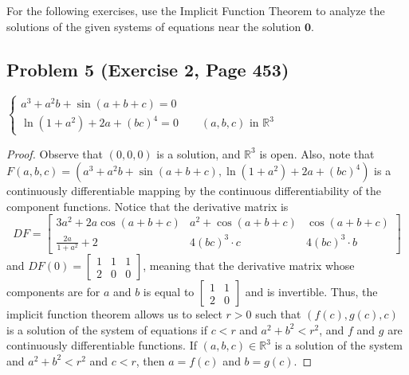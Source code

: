 \documentclass{article}
\begin{document}
For the following exercises, use the Implicit Function Theorem to analyze the solutions of the given systems of equations near the solution $\textbf{0}$.

\subsection*{Problem 5 (Exercise 2, Page 453)}
$\begin{cases} a^3 + a^2b + \sin{(a + b + c)} = 0 \\ \ln{(1 + a^2)} + 2a + (bc)^4 = 0 \qquad \text{$(a, b, c)$ in $\mathbb{R}^3$} \end{cases}$
\begin{proof}
Observe that $(0, 0, 0)$ is a solution, and $\mathbb{R}^3$ is open. Also, note that $F(a, b, c) = (a^3 + a^2b + \sin{(a + b + c)}, \ln{(1 + a^2)} + 2a + (bc)^4)$ is a continuously differentiable mapping by the continuous differentiability of the component functions. Notice that the derivative matrix is 
\[ DF = \begin{bmatrix} 3a^2+2a\cos(a+b+c) & a^2 + \cos(a+b+c) & \cos(a+b+c) \\
\frac{2a}{1+a^2} + 2 & 4(bc)^3 \cdot c & 4(bc)^3 \cdot b 
\end{bmatrix}\]
and $DF(0) = \begin{bmatrix} 1 & 1 & 1 \\ 2 & 0 & 0 \end{bmatrix}$, meaning that the derivative matrix whose components are for $a$ and $b$ is equal to $\begin{bmatrix} 1 & 1 \\ 2 & 0 \end{bmatrix}$ and is invertible. Thus, the implicit function theorem allows us to select $r>0$ such that $(f(c), g(c), c)$ is a solution of the system of equations if $c < r$ and $a^2 + b^2 < r^2$, and $f$ and $g$ are continuously differentiable functions. If $(a, b, c) \in \mathbb{R}^3$ is a solution of the system and $a^2 + b^2 < r^2$ and $c<r$, then $a = f(c)$ and $b = g(c)$.
\end{proof}
\end{document}
